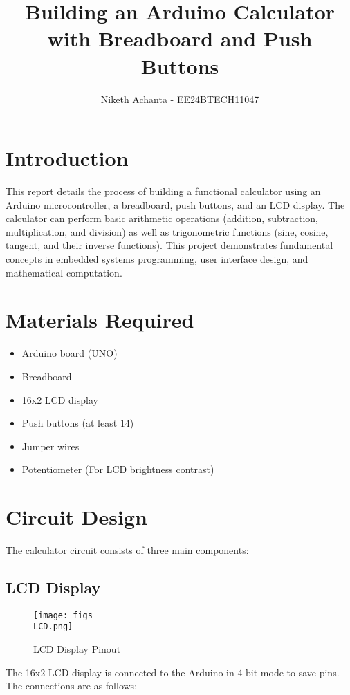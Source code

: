 \documentclass{article}
\title{Building an Arduino Calculator with Breadboard and Push Buttons}
\author{Niketh Achanta - EE24BTECH11047}
\date{}
\begin{document}
\maketitle

\section{Introduction}

This report details the process of building a functional calculator using an Arduino microcontroller, a breadboard, push buttons, and an LCD display. The calculator can perform basic arithmetic operations (addition, subtraction, multiplication, and division) as well as trigonometric functions (sine, cosine, tangent, and their inverse functions). This project demonstrates fundamental concepts in embedded systems programming, user interface design, and mathematical computation.

\section{Materials Required}

\begin{itemize}
    \item Arduino board (UNO)
    \item Breadboard
    \item 16x2 LCD display
    \item Push buttons (at least 14)
    \item Jumper wires
    \item Potentiometer (For LCD brightness contrast)
\end{itemize}

\section{Circuit Design}

The calculator circuit consists of three main components:

\subsection{LCD Display}
\begin{figure}[h]
    \centering
    \texttt{[image: figs\\LCD.png]}
    \caption{LCD Display Pinout}
\end{figure}
The 16x2 LCD display is connected to the Arduino in 4-bit mode to save pins. The connections are as follows:
\end{document}
